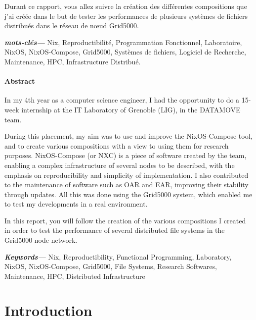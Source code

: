 \documentclass[a4paper,french,12pt, titlepage]{article}
\newcommand{\paragraphnewline}[1]{\hypertarget{par#1}{\paragraph{#1}\mbox{}}}
\begin{document}
Durant ce rapport, vous allez suivre la création des différentes
compositions que j'ai créée dans le but de tester les performances de
plusieurs systèmes de fichiers distribués dans le réseau de nœud
Grid5000.


\textbf{\textit{mots-clés---}} Nix, Reproductibilité, Programmation
Fonctionnel, Laboratoire, NixOS, NixOS-Compose, Grid5000, Systèmes de
fichiers, Logiciel de Recherche, Maintenance, HPC, Infrastructure
Distribué.

\begin{center}
    \item \paragraphnewline{Abstract}
\end{center}

In my 4th year as a computer science engineer, I had the opportunity to
do a 15-week internship at the IT Laboratory of Grenoble (LIG), in the
DATAMOVE team.\newline

During this placement, my aim was to use and improve the NixOS-Compose
tool, and to create various compositions with a view to using them for
research purposes. NixOS-Compose (or NXC) is a piece of software created
by the team, enabling a complex infrastructure of several nodes to be
described, with the emphasis on reproducibility and simplicity of
implementation. I also contributed to the maintenance of software such
as OAR and EAR, improving their stability through updates. All this was
done using the Grid5000 system, which enabled me to test my developments
in a real environment.\newline 

In this report, you will follow the creation of the various compositions
I created in order to test the performance of several distributed file
systems in the Grid5000 node network.

\textbf{\textit{Keywords---}} Nix, Reproductibility, Functional
Programming, Laboratory, NixOS, NixOS-Compose, Grid5000, File Systems,
Research Softwares, Maintenance, HPC, Distributed Infrastructure

\newpage

\tableofcontents
\newpage

\listoffigures

\newpage

\hypertarget{introduction}{%
\section{Introduction}\label{introduction}}
\end{document}
